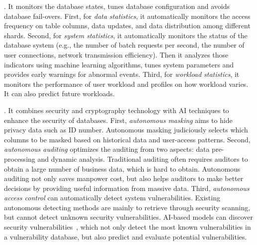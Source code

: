 . It monitors the database states, tunes database configuration and avoids database fail-overs. First, for \textit{data statistics}, it automatically monitors the access frequency on table columns, data updates, and data distribution among different shards.
Second, for \textit{system statistics}, it automatically monitors the status of the database system (e.g., the number of batch requests per second, the number of user connections, network transmission efficiency). Then it analyzes those indicators using machine learning algorithms, tunes system parameters and provides early warnings for abnormal events. Third, for \textit{workload statistics}, it monitors the performance of user workload and profiles on how workload varies. It can also predict  future workloads.



. It combines security and cryptography technology with AI techniques to enhance the security of databases. First, \textit{autonomous masking} aims to hide privacy data such as ID number. Autonomous masking judiciously selects which columns to be masked based on historical data and user-access patterns. Second, \textit{autonomous auditing} optimizes the auditing from two aspects: data pre-processing and dynamic analysis. Traditional auditing often requires auditors to obtain a large number of business data, which is hard to obtain. Autonomous auditing not only saves manpower cost, but also helps auditors to make better decisions by providing useful information from massive data.  Third, \textit{autonomous access control} can automatically detect system vulnerabilities. Existing autonomous detecting methods are mainly to retrieve through security scanning, but cannot detect unknown security vulnerabilities.  AI-based models can discover security vulnerabilities~\cite{DBLP:journals/corr/abs-1902-10680}, which not only detect the most known vulnerabilities in a vulnerability database, but also predict and evaluate potential vulnerabilities.  


